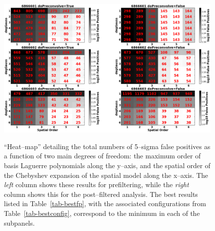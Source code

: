 \documentclass[prd, nofootinbib, floatfix, 11pt,tightenlines,times]{article}
\begin{document}
\begin{figure}
\includegraphics[width=1.0\textwidth]{figures/heatmap10.eps} \\
\caption{``Heat--map'' detailing the total numbers of 5--sigma false
  positives as a function of two main degrees of freedom: the maximum
  order of basis Laguerre polynomials along the y--axis, and the
  spatial order of the Chebyshev expansion of the spatial model along
  the x--axis.  The {\it left} column shows these results for
  prefiltering, while the {\it right} column shows this for the
  post--filtered analysis.  The best results listed in
  Table~\ref{tab-bestfp}, with the associated configurations from
  Table~\ref{tab-bestconfig}, correspond to the minimum in each of the
  subpanels.  }
\label{fp_heatmap}
\end{figure}
\end{document}

